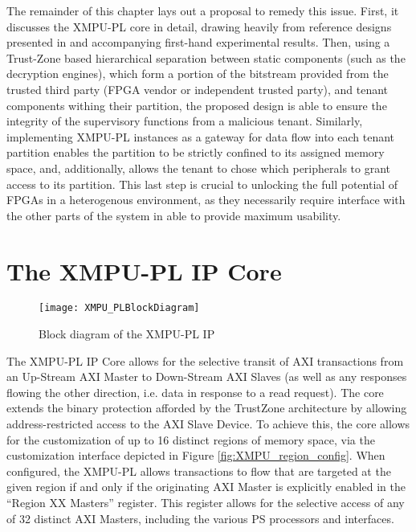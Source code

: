 The remainder of this chapter lays out a proposal to remedy this issue. First, it discusses the XMPU-PL core in detail, drawing heavily from reference designs presented in \cite{noauthor_memory_2021} and accompanying first-hand experimental results. Then, using a Trust-Zone based hierarchical separation between static components (such as the decryption engines), which form a portion of the bitstream provided from the trusted third party (FPGA vendor or independent trusted party), and tenant components withing their partition, the proposed design is able to ensure the integrity of the supervisory functions from a malicious tenant. Similarly, implementing XMPU-PL instances as a gateway for data flow into each tenant partition enables the partition to be strictly confined to its assigned memory space, and, additionally, allows the tenant to chose which peripherals to grant access to its partition. This last step is crucial to unlocking the full potential of FPGAs in a heterogenous environment, as they necessarily require interface with the other parts of the system in able to provide maximum usability.

\section{The XMPU-PL IP Core}

\begin{figure}[h]
    \centering
    \texttt{[image: XMPU\_PLBlockDiagram]}
    \caption [XMPU-PL Block Diagram]{Block diagram of the XMPU-PL IP \cite{noauthor_memory_2021}}
    \label{fig:XMPU_PL_BD}
\end{figure}

The XMPU-PL IP Core allows for the selective transit of AXI transactions from an Up-Stream AXI Master to Down-Stream AXI Slaves (as well as any responses flowing the other direction, i.e. data in response to a read request). The core extends the binary protection afforded by the TrustZone architecture by allowing address-restricted access to the AXI Slave Device. To achieve this, the core allows for the customization of up to 16 distinct regions of memory space, via the customization interface depicted in Figure \ref{fig:XMPU_region_config}. When configured, the XMPU-PL allows transactions to flow that are targeted at the given region if and only if the originating AXI Master is explicitly enabled in the ``Region XX Masters'' register. This register allows for the selective access of any of 32 distinct AXI Masters, including the various PS processors and interfaces. 

